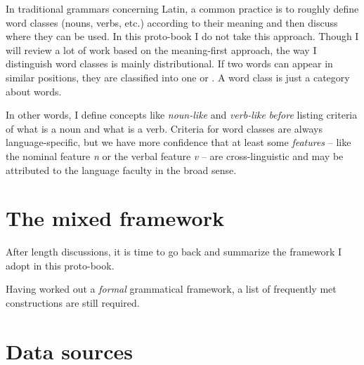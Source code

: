 \documentclass[../main.tex]{subfiles}
\begin{document}
In traditional grammars concerning Latin, a common practice is to roughly define word classes (nouns, verbs, etc.) 
according to their meaning and then discuss where they can be used. 
In this proto-book I do not take this approach. Though I will review a lot of work based on the meaning-first 
approach, the way I distinguish word classes is mainly distributional. If two words can appear in similar
positions, they are classified into one  or .
A word class is just a category about words.  

In other words, I define concepts like \emph{noun-like} and \emph{verb-like} \emph{before} listing criteria of 
what is a noun and what is a verb. Criteria for word classes are always language-specific, but we have more 
confidence that at least some \emph{features} -- like the nominal feature \textit{n} or the verbal feature 
\textit{v} -- are cross-linguistic and may be attributed to the language faculty in the broad sense. 

\section{The mixed framework}


After length discussions, it is time to go back and summarize the framework I adopt in this proto-book.

Having worked out a \emph{formal} grammatical framework, a list of frequently met constructions 
are still required. 


\section{Data sources}

\end{document}
